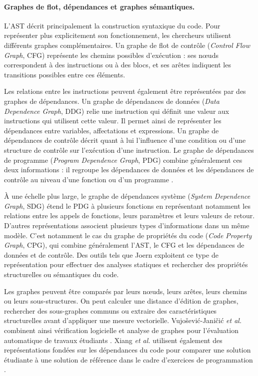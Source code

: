 \documentclass[12pt,a4paper,oneside]{report}
\begin{document}
\paragraph{Graphes de flot, dépendances et graphes sémantiques.}

L'AST décrit principalement la construction syntaxique du code. Pour
représenter plus explicitement son fonctionnement, les chercheurs utilisent
différents graphes complémentaires. Un graphe de flot de contrôle
(\emph{Control Flow Graph}, CFG) représente les chemins possibles
d'exécution : ses nœuds correspondent à des instructions ou à des blocs, et
ses arêtes indiquent les transitions possibles entre ces éléments.

Les relations entre les instructions peuvent également être représentées par
des graphes de dépendances. Un graphe de dépendances de données
(\emph{Data Dependence Graph}, DDG) relie une instruction qui définit une
valeur aux instructions qui utilisent cette valeur. Il permet ainsi de
représenter les dépendances entre variables, affectations et expressions. Un
graphe de dépendances de contrôle décrit quant à lui l'influence d'une
condition ou d'une structure de contrôle sur l'exécution d'une instruction.
Le graphe de dépendances de programme (\emph{Program Dependence Graph},
PDG) combine généralement ces deux informations : il regroupe les
dépendances de données et les dépendances de contrôle au niveau d'une
fonction ou d'un programme \cite{xiang_graph_2024,reddy_graph-based_2025}.

À une échelle plus large, le graphe de dépendances système
(\emph{System Dependence Graph}, SDG) étend le PDG à plusieurs fonctions en
représentant notamment les relations entre les appels de fonctions, leurs
paramètres et leurs valeurs de retour. D'autres représentations associent
plusieurs types d'informations dans un même modèle. C'est notamment le cas
du graphe de propriétés du code (\emph{Code Property Graph}, CPG), qui
combine généralement l'AST, le CFG et les dépendances de données et de
contrôle. Des outils tels que Joern exploitent ce type de représentation
pour effectuer des analyses statiques et rechercher des propriétés
structurelles ou sémantiques du code.

Les graphes peuvent être comparés par leurs nœuds, leurs arêtes, leurs
chemins ou leurs sous-structures. On peut calculer une distance d'édition de
graphes, rechercher des sous-graphes communs ou extraire des caractéristiques
structurelles avant d'appliquer une mesure vectorielle. Vujošević-Janičić
\emph{et al.} combinent ainsi vérification logicielle et analyse de graphes
pour l'évaluation automatique de travaux étudiants
\cite{vujosevic-janicic_software_2013}. Xiang \emph{et al.} utilisent
également des représentations fondées sur les dépendances du code pour
comparer une solution étudiante à une solution de référence dans le cadre
d'exercices de programmation \cite{xiang_graph_2024}.
\end{document}
